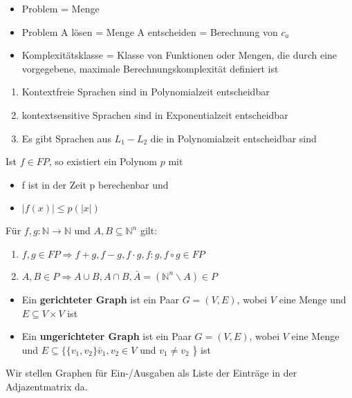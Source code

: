 \documentclass[14pt]{article}
\begin{document}
\begin{eigenschaft}[Terminologie]
    \begin{itemize}
        \item Problem = Menge
        \item Problem A lösen = Menge A entscheiden = Berechnung von $c_a$
        \item Komplexitätsklasse = Klasse von Funktionen oder Mengen, die durch 
        eine vorgegebene, maximale Berechnungskomplexität definiert ist
    \end{itemize}
\end{eigenschaft}
\begin{eigenschaft}
    \begin{enumerate}
        \item Kontextfreie Sprachen sind in Polynomialzeit entscheidbar
        \item kontextsensitive Sprachen sind in Exponentialzeit entscheidbar
        \item Es gibt Sprachen aus $L_1 - L_2$ die in Polynomialzeit entscheidbar sind
    \end{enumerate}
\end{eigenschaft}
\begin{eigenschaft}
    Ist $f \in FP$, so existiert ein Polynom $p$ mit 
    \begin{itemize}
        \item f ist in der Zeit p berechenbar und
        \item $|f(x)| \leq p(|x|)$
    \end{itemize}
\end{eigenschaft}
\begin{eigenschaft}
    Für $f, g : \mathbb{N} \rightarrow \mathbb{N}$ und $A, B \subseteq \mathbb{N}^n$ gilt:
    \begin{enumerate}
        \item $f, g \in FP \Rightarrow f + g, f - g, f \cdot g, f : g, f \circ g \in FP$
        \item $A, B \in P \Rightarrow A \cup B, A \cap B, \bar{A} = (\mathbb{N}^n \backslash A) \in P$
    \end{enumerate}
\end{eigenschaft}
\begin{definition}[Graph]
    \begin{itemize}
        \item Ein \textbf{gerichteter Graph} ist ein Paar $G = (V, E)$, wobei $V$ 
        eine Menge und $E \subseteq V \times V$ ist
        \item Ein \textbf{ungerichteter Graph} ist ein Paar $G = (V, E)$, wobei $V$ 
        eine Menge und $E \subseteq \{ \{ v_1, v_2\} \bar v_1, v_2 \in V$ und $v_1 \neq v_2$ \} ist
    \end{itemize}
    Wir stellen Graphen für Ein-/Ausgaben als Liste der Einträge in der 
    Adjazentmatrix da.
\end{definition}
\end{document}
